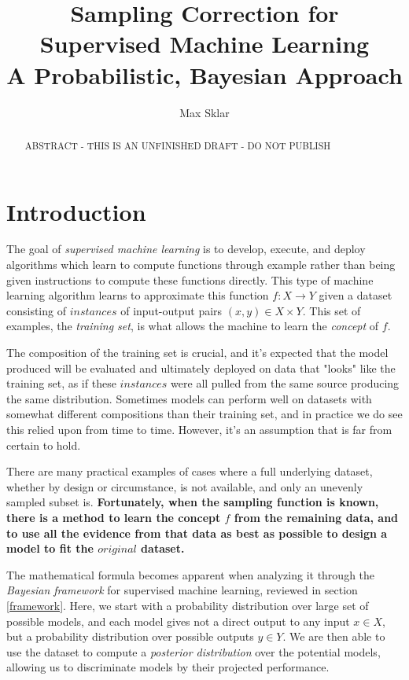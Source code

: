 \documentclass[twoside]{article}
\begin{document}
\parindent=0in
\parskip=12pt

\title{
  Sampling Correction for Supervised Machine Learning \\
  \large{
    A  Probabilistic, Bayesian Approach
  }
}

\author{Max Sklar}

\maketitle
\thispagestyle{empty}

\begin{abstract}
ABSTRACT - THIS IS AN UNFINISHED DRAFT - DO  NOT PUBLISH
\end{abstract}

\section{Introduction}

The goal of \textit{supervised machine learning} is to develop, execute, and deploy algorithms which learn to compute functions through example rather than being given instructions to compute these functions directly. This type of machine learning algorithm learns to approximate this function \(f: X \to Y\) given a dataset consisting of \(instances\) of input-output pairs \((x, y) \in X \times Y\). This set of examples, the \textit{training set}, is what allows the machine to learn the \textit{concept} of \(f\).

The composition of the training set is crucial, and it's expected that the model produced will be evaluated and ultimately deployed on data that "looks" like the training set, as if these \(instances\) were all pulled from the same source producing the same distribution. Sometimes models can perform well on datasets with somewhat different compositions than their training set, and in practice we do see this relied upon from time to time. However, it's an assumption that is far from certain to hold.

There are many practical examples of cases where a full underlying dataset, whether by design or circumstance, is not available, and only an unevenly sampled subset is. \textbf{Fortunately, when the sampling function is known, there is a method to learn the concept \(f\) from the remaining data, and to use all the evidence from that data as best as possible to design a model to fit the \(original\) dataset.} 

The mathematical formula becomes apparent when analyzing it through the \textit{Bayesian framework} for supervised machine learning, reviewed in section \ref{framework}. Here, we start with a probability distribution over large set of possible models, and each model gives not a direct output to any input \(x \in X\), but a probability distribution over possible outputs \(y \in Y\). We are then able to use the dataset to compute a \textit{posterior distribution} over the potential models, allowing us to discriminate models by their projected performance.
\end{document}
